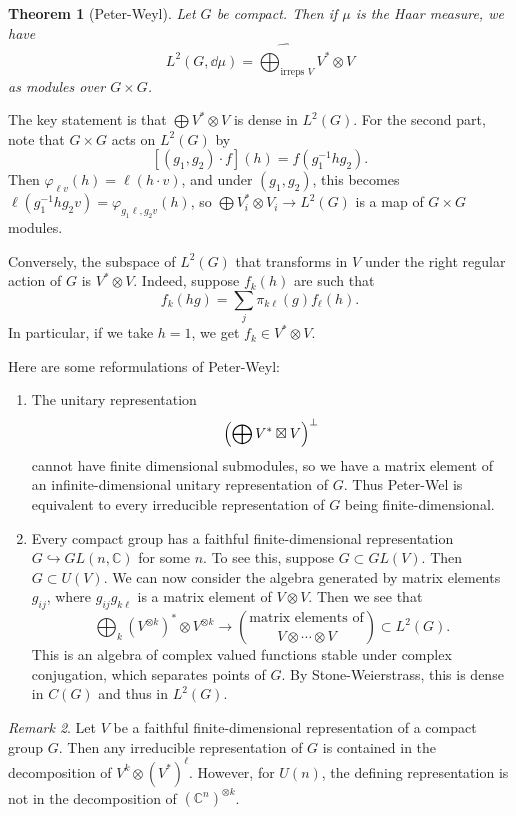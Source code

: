 \documentclass[leqno, openany]{memoir}
\newtheorem{thm}{Theorem}[section]
\theoremstyle{definition}
\theoremstyle{remark}
\newtheorem{rmk}[thm]{Remark}
\theoremstyle{plain}
\theoremstyle{definition}
\theoremstyle{remark}
\newcommand{\C}{\mathbb{C}}
\newcommand{\wh}[1]{\widehat{#1}}
\begin{document}
\begin{thm}[Peter-Weyl]
    Let $G$ be compact. Then if $\mu$ is the Haar measure, we have
    \[ L^2(G, \dd{\mu}) = \wh{\bigoplus_{{\text{irreps } V}}} V^* \otimes V \]
    as modules over $G \times G$.
\end{thm}

The key statement is that $\bigoplus V^* \otimes V$ is dense in $L^2(G)$. For the second part, note that $G \times G$ acts on $L^2(G)$ by
\[ [(g_1, g_2) \cdot f](h) = f(g_1^{-1} h g_2). \]
Then $\varphi_{\ell v}(h) = \ell(h \cdot v)$, and under $(g_1, g_2)$, this becomes $\ell(g_1^{-1}h g_2 v) = \varphi_{g_1 \ell, g_2 v}(h)$, so $\bigoplus V_i^* \otimes V_i \to L^2(G)$ is a map of $G \times G$ modules. 

Conversely, the subspace of $L^2(G)$ that transforms in $V$ under the right regular action of $G$ is $V^* \otimes V$. Indeed, suppose $f_k(h)$ are such that
\[ f_k(hg) = \sum_j \pi_{k \ell}(g) f_{\ell}(h). \]
In particular, if we take $h = 1$, we get $f_k \in V^* \otimes V$.

Here are some reformulations of Peter-Weyl: 
\begin{enumerate}
    \item The unitary representation
        \[ \qty( \bigoplus V^* \boxtimes V )^{\perp} \]
        cannot have finite dimensional submodules, so we have a matrix element of an infinite-dimensional unitary representation of $G$. Thus Peter-Wel is equivalent to every irreducible representation of $G$ being finite-dimensional.
    \item Every compact group has a faithful finite-dimensional representation $G \hookrightarrow GL(n, \C)$ for some $n$. To see this, suppose $G \subset GL(V)$. Then $G \subset U(V)$. We can now consider the algebra generated by matrix elements $g_{ij}$, where $g_{ij} g_{k\ell}$ is a matrix element of $V \otimes V$. Then we see that
        \[ \bigoplus_{k} (V^{\otimes k})^* \otimes V^{\otimes k} \longrightarrow  \binom{\text{matrix elements of}}{V \otimes \cdots \otimes V}  \subset L^2(G). \]
        This is an algebra of complex valued functions stable under complex conjugation, which separates points of $G$. By Stone-Weierstrass, this is dense in $C(G)$ and thus in $L^2(G)$.
\end{enumerate}

\begin{rmk}
    Let $V$ be a faithful finite-dimensional representation of a compact group $G$. Then any irreducible representation of $G$ is contained in the decomposition of $V^k \otimes (V^*)^{\ell}$. However, for $U(n)$, the defining representation is not in the decomposition of $(\C^n)^{\otimes k}$.
\end{rmk}
\end{document}
